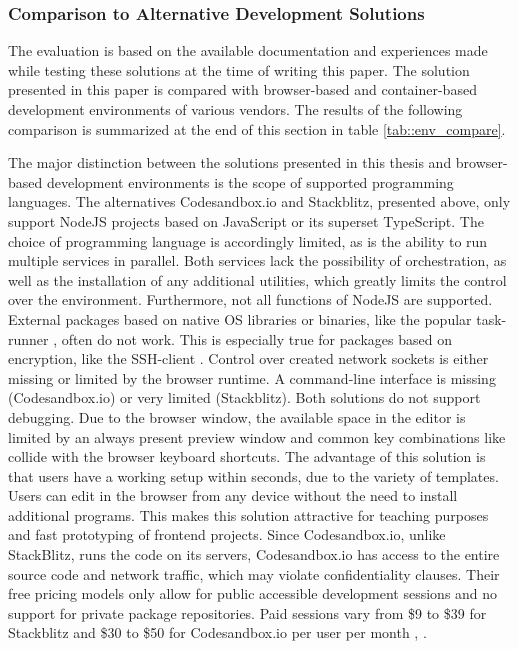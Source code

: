         \subsubsection{Comparison to Alternative Development Solutions}
        The evaluation is based on the available documentation and experiences made while testing these solutions at the time of writing this paper. The solution presented in this paper is compared with browser-based and container-based development environments of various vendors. The results of the following comparison is summarized at the end of this section in table \ref{tab::env_compare}.

        The major distinction between the solutions presented in this thesis and browser-based development environments is the scope of supported programming languages. The alternatives Codesandbox.io and Stackblitz, presented above, only support NodeJS projects based on JavaScript or its superset TypeScript. The choice of programming language is accordingly limited, as is the ability to run multiple services in parallel. Both services lack the possibility of orchestration, as well as the installation of any additional utilities, which greatly limits the control over the environment. \newline
        Furthermore, not all functions of NodeJS are supported. External packages based on native \acl{OS} libraries or binaries, like the popular task-runner , often do not work. This is especially true for packages based on encryption, like the \ac{SSH}-client . Control over created network sockets is either missing or limited by the browser runtime. A command-line interface is missing (Codesandbox.io) or very limited (Stackblitz). Both solutions do not support debugging. Due to the browser window, the available space in the editor is limited by an always present preview window and common key combinations like  collide with the browser keyboard shortcuts.\newline
        The advantage of this solution is that users have a working setup within seconds, due to the variety of templates. Users can edit in the browser from any device without the need to install additional programs. This makes this solution attractive for teaching purposes and fast prototyping of frontend projects. Since Codesandbox.io, unlike StackBlitz, runs the code on its servers, Codesandbox.io has access to the entire source code and network traffic, which may violate confidentiality clauses. Their free pricing models only allow for public accessible development sessions and no support for private package repositories. Paid sessions vary from \$9 to \$39 for Stackblitz and \$30 to \$50 for Codesandbox.io per user per month \cite{stackblitz}, \cite{codesandbox}. \newline
